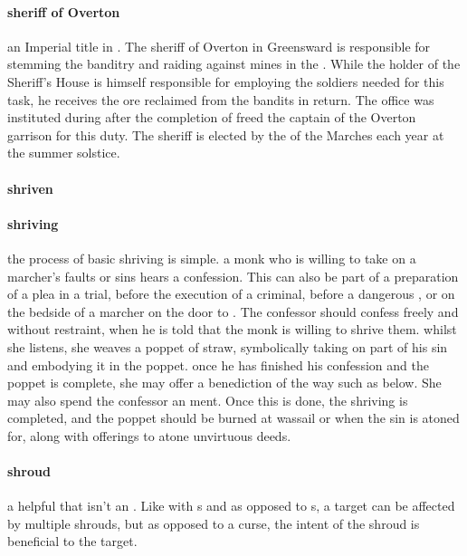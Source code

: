 \paragraph{sheriff of Overton} an Imperial title in . The sheriff of Overton in Greensward is responsible for stemming the banditry and raiding against mines in the . While the holder of the Sheriff's House is himself responsible for employing the soldiers needed for this task, he receives the ore reclaimed from the bandits in return. The office was instituted during after the completion of  freed the captain of the Overton garrison for this duty. The sheriff is elected by the  of the Marches each year at the summer solstice.
\paragraph{shriven} 
\paragraph{shriving} the process of basic shriving is simple. a monk who is willing to take on a marcher’s faults or sins hears a confession. This can also be part of a preparation of a  plea in a trial, before the execution of a criminal, before a dangerous , or on the bedside of a marcher on the door to . The confessor should confess freely and without restraint, when he is told that the monk is willing to shrive them. whilst she listens, she weaves a poppet of straw, symbolically taking on part of his sin and embodying it in the poppet. once he has finished his confession and the poppet is complete, she may offer a benediction of the way such as below. She may also spend the confessor an ment. Once this is done, the shriving is completed, and the poppet should be burned at wassail or when the sin is atoned for, along with offerings to atone unvirtuous deeds. 
\paragraph{shroud} a helpful  that isn't an . Like with s and as opposed to s, a target can be affected by multiple shrouds, but as opposed to a curse, the intent of the shroud is beneficial to the target.

